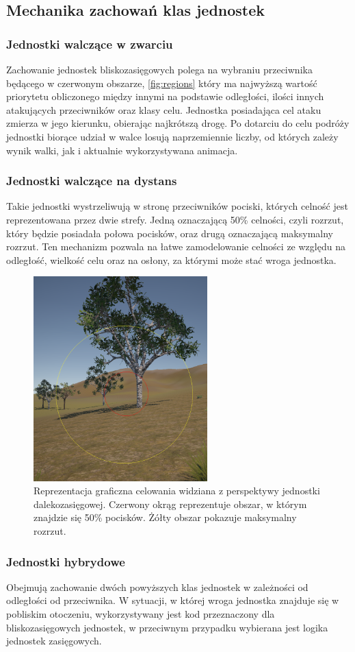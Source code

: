 \subsection{Mechanika zachowań klas jednostek}
\subsubsection{Jednostki walczące w zwarciu}
Zachowanie jednostek bliskozasięgowych polega na wybraniu przeciwnika będącego w czerwonym obszarze, \ref{fig:regions} który ma najwyższą
wartość priorytetu obliczonego między innymi na podstawie odległości, ilości innych atakujących przeciwników oraz klasy celu.
Jednostka posiadająca cel ataku zmierza w jego kierunku, obierając najkrótszą drogę. Po dotarciu do celu podróży jednostki biorące udział w walce
losują naprzemiennie liczby, od których zależy wynik walki, jak i aktualnie wykorzystywana animacja.

\subsubsection{Jednostki walczące na dystans}
Takie jednostki wystrzeliwują w stronę przeciwników pociski, których celność jest reprezentowana przez dwie strefy. Jedną oznaczającą 50\% celności,
czyli rozrzut, który będzie posiadała połowa pocisków, oraz drugą oznaczającą maksymalny rozrzut. Ten mechanizm pozwala na łatwe zamodelowanie
celności ze względu na odległość, wielkość celu oraz na osłony, za którymi może stać wroga jednostka.
\begin{figure}[h]
\centering
\includegraphics[width=0.6\textwidth]{images/acc}
\caption{Reprezentacja graficzna celowania widziana z perspektywy jednostki dalekozasięgowej. Czerwony okrąg reprezentuje obszar, w którym znajdzie się 50\% pocisków. Żółty obszar pokazuje maksymalny rozrzut.}
\label{fig:acc2}
\end{figure}
\subsubsection{Jednostki hybrydowe}
Obejmują zachowanie dwóch powyższych klas jednostek w zależności od odległości od przeciwnika.
W sytuacji, w której wroga jednostka znajduje się w pobliskim otoczeniu, wykorzystywany jest kod przeznaczony dla bliskozasięgowych jednostek,
w przeciwnym przypadku wybierana jest logika jednostek zasięgowych.
